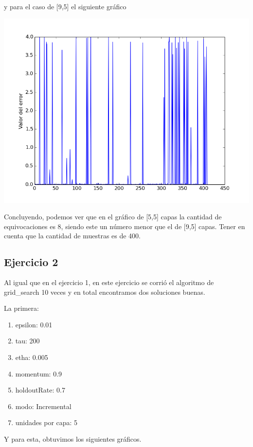 y para el caso de [9,5] el siguiente gráfico

\begin{center}
\includegraphics[scale=0.4]{img/ej195_histograma}
\end{center}

Concluyendo, podemos ver que en el gráfico de [5,5] capas la cantidad de equivocaciones es 8, siendo este un número menor que el de [9,5] capas. Tener en cuenta que la cantidad de muestras es de 400.

\newpage

\subsection{Ejercicio 2}

Al igual que en el ejercicio 1, en este ejercicio se corrió el algoritmo de grid\_search 10 veces y en total encontramos dos  soluciones buenas. 

La primera:

\begin{enumerate}
\item epsilon: 0.01
\item tau: 200
\item etha: 0.005
\item momentum: 0.9
\item holdoutRate: 0.7
\item modo: Incremental
\item unidades por capa: 5
\end{enumerate}

Y para esta, obtuvimos los siguientes gráficos.

